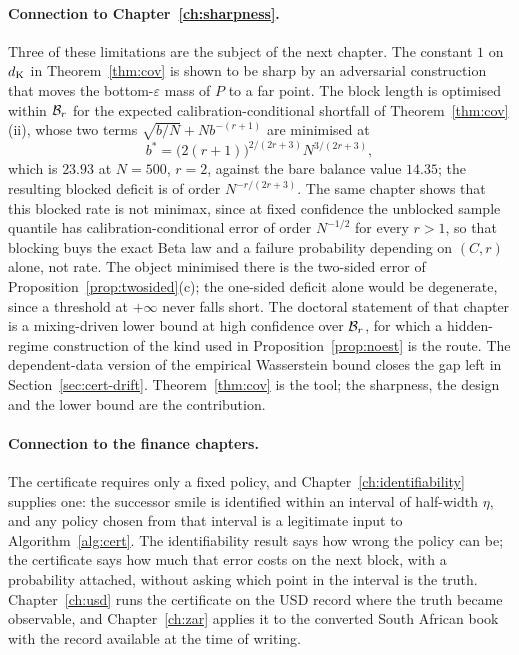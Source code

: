 \documentclass[../../../main.tex]{subfiles}
\begin{document}
\paragraph{Connection to Chapter~\ref{ch:sharpness}.} Three of these limitations are the subject of the next chapter. The constant $1$ on $d_{\mathrm{K}}$ in Theorem~\ref{thm:cov} is shown to be sharp by an adversarial construction that moves the bottom-$\varepsilon$ mass of $P$ to a far point. The block length is optimised within $\mathcal B_{r}$ for the expected calibration-conditional shortfall of Theorem~\ref{thm:cov}(ii), whose two terms $\sqrt{b/N}+Nb^{-(r+1)}$ are minimised at
\[
b^*=\big(2(r+1)\big)^{2/(2r+3)}N^{3/(2r+3)},
\]
which is $23.93$ at $N=500$, $r=2$, against the bare balance value $14.35$; the resulting blocked deficit is of order $N^{-r/(2r+3)}$. The same chapter shows that this blocked rate is not minimax, since at fixed confidence the unblocked sample quantile has calibration-conditional error of order $N^{-1/2}$ for every $r>1$, so that blocking buys the exact Beta law and a failure probability depending on $(C,r)$ alone, not rate. The object minimised there is the two-sided error of Proposition~\ref{prop:twosided}(c); the one-sided deficit alone would be degenerate, since a threshold at $+\infty$ never falls short. The doctoral statement of that chapter is a mixing-driven lower bound at high confidence over $\mathcal B_{r}$, for which a hidden-regime construction of the kind used in Proposition~\ref{prop:noest} is the route. The dependent-data version of the empirical Wasserstein bound closes the gap left in Section~\ref{sec:cert-drift}. Theorem~\ref{thm:cov} is the tool; the sharpness, the design and the lower bound are the contribution.

\paragraph{Connection to the finance chapters.} The certificate requires only a fixed policy, and Chapter~\ref{ch:identifiability} supplies one: the successor smile is identified within an interval of half-width $\eta$, and any policy chosen from that interval is a legitimate input to Algorithm~\ref{alg:cert}. The identifiability result says how wrong the policy can be; the certificate says how much that error costs on the next block, with a probability attached, without asking which point in the interval is the truth. Chapter~\ref{ch:usd} runs the certificate on the USD record where the truth became observable, and Chapter~\ref{ch:zar} applies it to the converted South African book with the record available at the time of writing.
\end{document}
